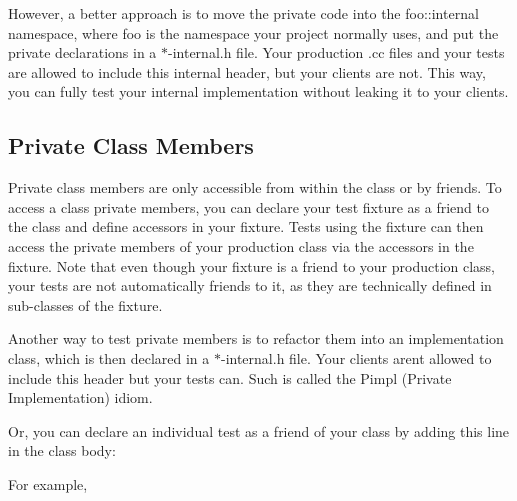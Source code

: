However, a better approach is to move the private code into the {\ttfamily foo\+::internal} namespace, where {\ttfamily foo} is the namespace your project normally uses, and put the private declarations in a {\ttfamily $\ast$-\/internal.h} file. Your production {\ttfamily .cc} files and your tests are allowed to include this internal header, but your clients are not. This way, you can fully test your internal implementation without leaking it to your clients.

\subsection*{Private Class Members}

Private class members are only accessible from within the class or by friends. To access a class\textquotesingle{} private members, you can declare your test fixture as a friend to the class and define accessors in your fixture. Tests using the fixture can then access the private members of your production class via the accessors in the fixture. Note that even though your fixture is a friend to your production class, your tests are not automatically friends to it, as they are technically defined in sub-\/classes of the fixture.

Another way to test private members is to refactor them into an implementation class, which is then declared in a {\ttfamily $\ast$-\/internal.h} file. Your clients aren\textquotesingle{}t allowed to include this header but your tests can. Such is called the Pimpl (Private Implementation) idiom.

Or, you can declare an individual test as a friend of your class by adding this line in the class body\+:


\begin{DoxyCode}{0}
\end{DoxyCode}


For example, 
\begin{DoxyCode}{0}
\DoxyCodeLine{}
\DoxyCodeLine{\};}
\DoxyCodeLine{}
\DoxyCodeLine{\}}
\end{DoxyCode}


